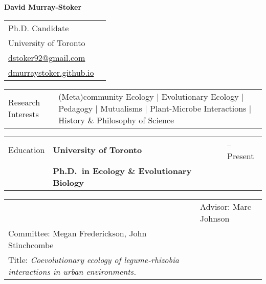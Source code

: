 \documentclass[letterpaper,11pt,oneside]{article}
\begin{document}
\thispagestyle{empty}

\noindent  \LARGE{\textbf{David Murray-Stoker}} 
\smallskip
\normalsize

\noindent \begin{tabular}{@{} p{10cm} >{\raggedleft\arraybackslash}p{8.11cm}}
Ph.D. Candidate \\
University of Toronto & \\
{\href{mailto:dstoker92@gmail.com}{dstoker92@gmail.com}} & \\
{\href{https://dmurraystoker.github.io}{dmurraystoker.github.io}} & \\


\end{tabular}
\vspace{1em}

\noindent\hrulefill 

\bigskip
\bigskip




\noindent \begin{tabular}{@{} p{3cm} >{\raggedright}p{14.2cm}}
\Large{Research Interests} & (Meta)community Ecology | Evolutionary Ecology | Pedagogy | Mutualisms | Plant-Microbe Interactions | History \& Philosophy of Science  \\
\end{tabular}

\bigskip



  

\noindent \begin{tabular}{@{} p{3cm} p{12cm} >{\raggedleft\arraybackslash}p{1.7cm}}
\Large{Education}    & \textbf{University of Toronto} & 2018--Present \\
& \textbf{Ph.D.\ in Ecology \& Evolutionary Biology} & \\
\end{tabular}

\noindent \begin{tabular}{@{} p{3cm} p{13.7cm}}
& \raggedright{Advisor: Marc Johnson} \\
\raggedright{Committee: Megan Frederickson, John Stinchcombe} \\ 
\raggedright{Title: \textit{Coevolutionary ecology of legume-rhizobia interactions in urban environments.}} \\
\end{tabular}
\end{document}
